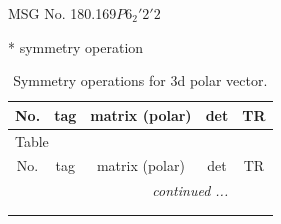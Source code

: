 \documentclass[fleqn,8pt]{jsarticle}
\begin{document}
\setcounter{MaxMatrixCols}{32}

\renewcommand{\tablename}{Table~}
\renewcommand{\figurename}{Figure~}
\begin{center}
\LARGE
MSG No. 180.169\quad$P6_{2}'2'2$
\end{center}
* symmetry operation
\renewcommand{\arraystretch}{1.3}
\begin{longtable}{ccccc}
\caption{Symmetry operations for 3d polar vector.}
 \\
 \hline \hline
No. & tag & matrix (polar) & det & TR \\ \hline \endfirsthead

\multicolumn{4}{l}{\tablename\ \thetable{}} \\
 \hline \hline
No. & tag & matrix (polar) & det & TR \\ \hline \endhead

 \hline \hline
\multicolumn{4}{r}{\footnotesize\it continued ...} \\ \endfoot

 \hline \hline
\multicolumn{4}{r}{} \\ \endlastfoot


\end{longtable}
\end{document}
